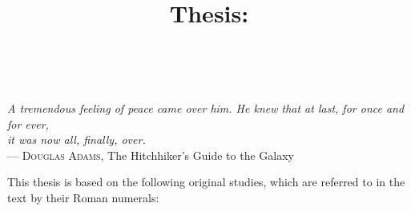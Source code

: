 \documentclass[11pt]{book}
\title{Thesis: \myMainTitle}
\begin{document}

\restoregeometry




\newpage
\thispagestyle{empty} %
~
\vspace{140pt}
\begin{flushright}
\textit{A tremendous feeling of peace came over him. He knew that at last, for once and for ever,\\it was now all, finally, over.}\\[5pt]--- \textsc{Douglas Adams}, The Hitchhiker's Guide to the Galaxy
\end{flushright}

\cleardoublepage

\setcounter{page}{1} %
\tableofcontents



This thesis is based on the following original studies, which are referred to in the text by their Roman numerals:
\vspace{5mm}

\renewcommand*{\thefootnote}{\fnsymbol{footnote}}
\end{document}
